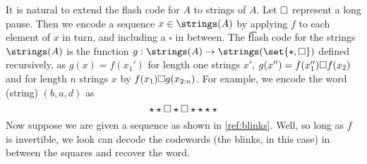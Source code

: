 It is natural to extend the flash code for $A$ to strings of $A$.
Let $\square$ represent a long pause.
Then we encode a sequence $x \in \strings(A)$ by applying $f$ to each element of $x$ in turn, and including a $\square$ in between.
The \t{flash code} for the strings $\strings(A)$ is the function $g: \strings(A) \to \strings(\set{\blink, \pause})$ defined recursively, as $g(x) = f(x_1')$ for length one strings $x'$, $g(x'') = f(x_1'')\square f(x_2)$ and for length $n$ strings $x$ by $f(x_1)\square g(x_{2:n})$.
For example, we encode the word (string) $(b,a,d)$ as
\begin{equation}
  \star
  \star
  \square
  \star
  \square
  \star
  \star
  \star
  \star
  \label{ref:blinks}
\end{equation}
Now suppose we are given a sequence as shown in \eqref{ref:blinks}.
Well, so long as $f$ is invertible, we look can decode the codewords (the blinks, in this case) in between the squares and recover the word.